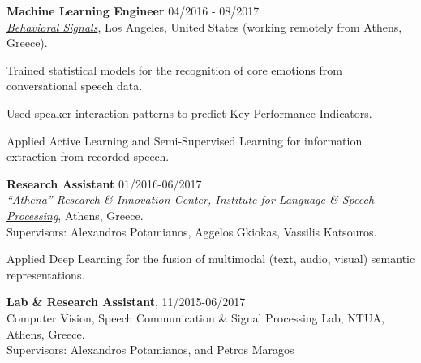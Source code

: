 \documentclass[letterpaper]{article}
\renewenvironment{itemize}{
  \begin{list}{}{
    \setlength{\leftmargin}{1.5em}
  }
}{
  \end{list}
}
\begin{document}
\begin{itemize}
\item 
    \textbf{Machine Learning Engineer} \hfill 04/2016 - 08/2017\\ 
    \href{https://behavioralsignals.com/}{\it Behavioral Signals}, Los Angeles, United States (working remotely from Athens, Greece).
    \begin{itemize}
        \item[-] Trained statistical models for the recognition of core emotions from conversational speech data.
        \item[-] Used speaker interaction patterns to predict Key Performance Indicators.
        \item[-] Applied Active Learning and Semi-Supervised Learning for information extraction from recorded speech. %
    \end{itemize}  


    
    

\item 
    \textbf{Research Assistant} \hfill 01/2016-06/2017\\
    \href{http://www.ilsp.gr/en}{\it ``Athena'' Research \& Innovation Center, Institute for Language \& Speech Processing}, Athens, Greece.\\
    Supervisors: Alexandros Potamianos, Aggelos Gkiokas, Vassilis Katsouros.


    \begin{itemize}
    \item[-] Applied Deep Learning for the fusion of multimodal (text, audio, visual) semantic representations. 
    \end{itemize}
\iffalse
\item 
    \textbf{Lab \& Research Assistant}, 11/2015-06/2017\\
    Computer Vision, Speech Communication \& Signal Processing Lab, NTUA, Athens, Greece.\\
    Supervisors: Alexandros Potamianos, and Petros Maragos


\end{itemize}
\end{document}
